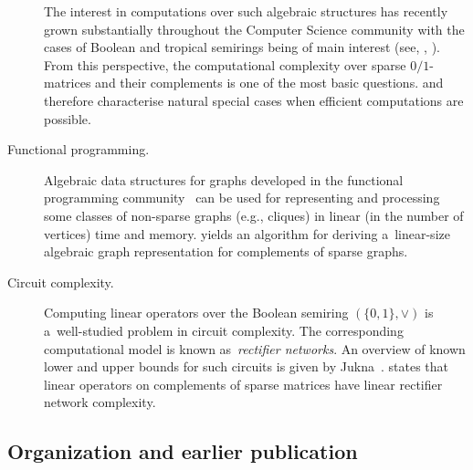 \documentclass{toc}
\begin{document}
\begin{description}
The interest in computations over such algebraic structures has
recently %
grown  %
substantially throughout the Computer Science community
with the cases of Boolean and
tropical semirings being of main interest (see,
\eg, \cite{Jukna16,Williams14,butkovic10systems}).
From this perspective, the %
computational %
complexity over %
sparse $0/1$-matrices and their complements %
is one of the most basic questions.
 and 
therefore characterise natural special
cases when efficient computations are possible.

\item[Functional programming.]
Algebraic data structures for graphs developed in the functional programming
community~\cite{mokhov2017algebraic} can be used for representing and processing
some classes of non-sparse graphs (e.g., cliques)
in linear (in the number of vertices) time and memory.
yields an algorithm for deriving a~linear-size algebraic graph representation
for complements of sparse graphs.

\item[Circuit complexity.] Computing linear operators over
the Boolean semiring $(\{0,1\}, \lor)$ is a~well-studied problem
in circuit complexity. The corresponding computational model is known
as~\emph{rectifier networks}. An overview of known lower and upper bounds for
such circuits is given by Jukna~\cite[Section~13.6]{DBLP:books/daglib/0028687}.
 states that linear operators on complements of
sparse matrices have linear rectifier network complexity.

\end{description}

\subsection{Organization and earlier publication}
\end{document}
